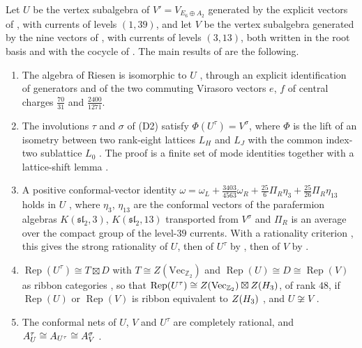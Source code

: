 \documentclass[leqno]{article}
\let\cal\relax
\newcommand{\cal}{\mathcal}
\newcommand{\Z}{\ensuremath{\mathbb{Z}}}
\DeclareMathOperator{\Rep}{Rep}
\numberwithin{equation}{section}
\begin{document}
Let $U$ be the vertex subalgebra of $V' = V_{E_6 \oplus A_2}$ generated by the explicit vectors of \cite[Section 2]{Hua26}, with currents of levels $(1,39)$, and let $V$ be the vertex subalgebra generated by the nine vectors of \cite[Section 3]{Jia26}, with currents of levels $(3,13)$, both written in the root basis and with the cocycle of \cite[Section 4.1]{DJX26}. The main results of \cite{DJX26} are the following.
\begin{enumerate}
\item The algebra of Riesen \cite{Rie26} is isomorphic to $U$ \cite[Proposition 4.1]{DJX26}, through an explicit identification of generators and of the two commuting Virasoro vectors $e$, $f$ of central charges $\frac{70}{31}$ and $\frac{2400}{1271}$.
\item The involutions $\tau$ and $\sigma$ of \textup{(D2)} satisfy $\Phi(U^\tau) = V^\sigma$, where $\Phi$ is the lift of an isometry between two rank-eight lattices $L_H$ and $L_J$ with the common index-two sublattice $L_0$ \cite[Sections 5--6 and Theorem 7.3]{DJX26}. The proof is a finite set of mode identities together with a lattice-shift lemma \cite[Lemma 7.1]{DJX26}.
\item A positive conformal-vector identity $\omega = \omega_L+\frac{3403}{4563}\omega_R+\frac{25}{6}\Pi_R\eta_3+\frac{25}{26}\Pi_R\eta_{13}$ holds in $U$ \cite[Proposition 8.1]{DJX26}, where $\eta_3$, $\eta_{13}$ are the conformal vectors of the parafermion algebras $K(\mathfrak{sl}_2,3)$, $K(\mathfrak{sl}_2,13)$ transported from $V^\sigma$ and $\Pi_R$ is an average over the compact group of the level-$39$ currents. With a rationality criterion \cite[Theorem 3.1]{DJX26}, this gives the strong rationality of $U$, then of $U^\tau$ by \cite{CaM16}, then of $V$ by \cite[Example 4.2]{McR22} \cite[Corollary 8.2]{DJX26}.
\item $\Rep(U^\tau) \cong T \boxtimes D$ with $T \cong Z(\mathrm{Vec}_{\Z_2})$ and $\Rep(U) \cong D \cong \Rep(V)$ as ribbon categories \cite[Lemma 9.1 and Proposition 9.2]{DJX26}, so that $\Rep(U^\tau) \cong Z(\mathrm{Vec}_{\Z_2}) \boxtimes Z(\cal H_3)$, of rank $48$, if $\Rep(U)$ or $\Rep(V)$ is ribbon equivalent to $Z(\cal H_3)$ \cite[Corollary 9.3]{DJX26}, and $U \not\cong V$ \cite[Proposition 9.4]{DJX26}.
\item The conformal nets of $U$, $V$ and $U^\tau$ are completely rational, and $\cal A_U^\tau \cong \cal A_{U^\tau} \cong \cal A_V^\sigma$ \cite[Theorem 10.1 and Corollary 10.2]{DJX26}.
\end{enumerate}
\end{document}

